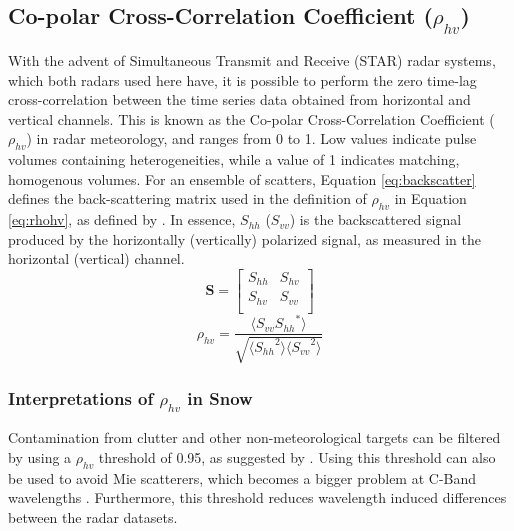 \subsection{Co-polar Cross-Correlation Coefficient ($\rho_{hv}$)}
With the advent of Simultaneous Transmit and Receive (STAR) radar systems, which both radars used here have, it is possible to perform the zero time-lag
cross-correlation between the time series data obtained from horizontal and vertical channels. This is known as the Co-polar Cross-Correlation Coefficient
($\rho_{hv}$) in radar meteorology, and ranges from 0 to 1. Low values indicate pulse volumes containing heterogeneities, while a value of 1 indicates
matching, homogenous volumes. For an ensemble of scatters, Equation \ref{eq:backscatter} defines the back-scattering matrix used in the definition of
$\rho_{hv}$ in Equation \ref{eq:rhohv}, as defined by \citet{Ryzhkov2007b}. In essence, $S_{hh}$ ($S_{vv}$) is the backscattered signal produced by the horizontally (vertically) polarized signal, as measured in the horizontal (vertical) channel.
\begin{equation}\label{eq:backscatter}
\mathbf{S} = \begin{bmatrix}
             S_{hh}       & S_{hv} \\
             S_{hv}       & S_{vv} \\
             \end{bmatrix}
\end{equation}
\begin{equation}\label{eq:rhohv}
\rho_{hv} = \frac{\langle{S_{vv}{S_{hh}}^{*}\rangle}}{\sqrt{\langle{{S_{hh}}^{2}\rangle}\langle{{S_{vv}}^{2}\rangle}}}
\end{equation}
\subsubsection{Interpretations of $\rho_{hv}$ in Snow}
Contamination from clutter and other non-meteorological targets can be filtered by using a $\rho_{hv}$ threshold of 0.95, as suggested by \citet{Straka2000}.
Using this threshold can also be used to avoid Mie scatterers, which becomes a bigger problem at C-Band wavelengths \citep{Fabry2015}. Furthermore, this threshold reduces wavelength induced differences between the radar datasets.
 



